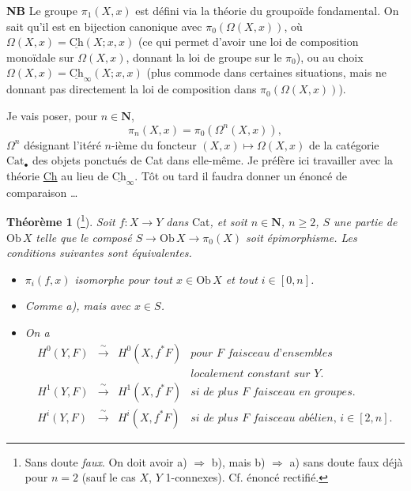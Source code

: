 \documentclass[11pt]{article}
\newcommand{\printedpage}[1]{{\reversemarginpar\marginnote{\raggedleft\scriptsize ed.~#1}}}
\newcommand{\msp}[1]{\marginpar{\raggedright\scriptsize ms.~#1}}
\newcommand{\Ch}{\underline{\mathrm{Ch}}}
\newcommand{\Ob}{\mathrm{Ob}\,}
\begin{document}
\clearpage

\printedpage{116}

\msp{page 172}

\textbf{NB} Le groupe $\pi_1(X,x)$ est défini via la théorie du groupoïde fondamental. On sait qu'il est en bijection canonique avec $\pi_0(\Omega(X,x))$, où $\Omega(X,x) = \Ch(X;x,x)$ (ce qui permet d'avoir une loi de composition monoïdale sur $\Omega(X,x)$, donnant la loi de groupe sur le $\pi_0$), ou au choix $\Omega(X,x) = \Ch_\infty(X;x,x)$ (plus commode dans certaines situations, mais ne donnant pas directement la loi de composition dans $\pi_0(\Omega(X,x))$).

Je vais poser, pour $n \in \mathbf{N}$,
\[
\pi_n(X,x) = \pi_0(\Omega^n(X,x)),
\]
$\Omega^n$ désignant l'itéré $n$-ième du foncteur $(X,x) \longmapsto \Omega(X,x)$ de la catégorie $\mathrm{Cat}_\bullet$ des objets ponctués de Cat dans elle-même. Je préfère ici travailler avec la théorie \underline{Ch} au lieu de $\Ch_\infty$. Tôt ou tard il faudra donner un énoncé de comparaison \dots

\textbf{Théorème 1} (\footnote[112]{Sans doute \textit{faux}. On doit avoir a) $\Longrightarrow$ b), mais b) $\Longrightarrow$ a) sans doute faux déjà pour $n = 2$ (sauf le cas $X$, $Y$ 1-connexes). Cf. énoncé rectifié.}). \textit{Soit $f : X \longrightarrow Y$ dans} Cat\textit{, et soit $n \in \mathbf{N}$, $n \geq 2$, $S$ une partie de} $\Ob X$ \textit{telle que le composé $S \longrightarrow \Ob X \longrightarrow \pi_0(X)$ soit} \textit{épimorphisme. Les conditions suivantes sont équivalentes.}

\begin{itemize}
\item[\textit{a)}] \textit{$\pi_i(f,x)$ isomorphe pour tout $x \in \Ob X$ et tout $i \in [0,n]$.}

\item[\textit{a$'$)}] \textit{Comme a), mais avec $x \in S$.}

\item[\textit{b)}] \textit{On a}
\[
\begin{array}{rcll}
H^0(Y,F) & \xrightarrow{\ \sim\ } & H^0(X,f^*F) & \textit{pour $F$ faisceau d'ensembles}\\
 & & & \textit{localement constant sur $Y$.}\\
H^1(Y,F) & \xrightarrow{\ \sim\ } & H^1(X,f^*F) & \textit{si de plus $F$ faisceau en groupes.}\\
H^i(Y,F) & \xrightarrow{\ \sim\ } & H^i(X,f^*F) & \textit{si de plus $F$ faisceau abélien, $i \in [2,n]$.}
\end{array}
\]
\end{itemize}
\end{document}
